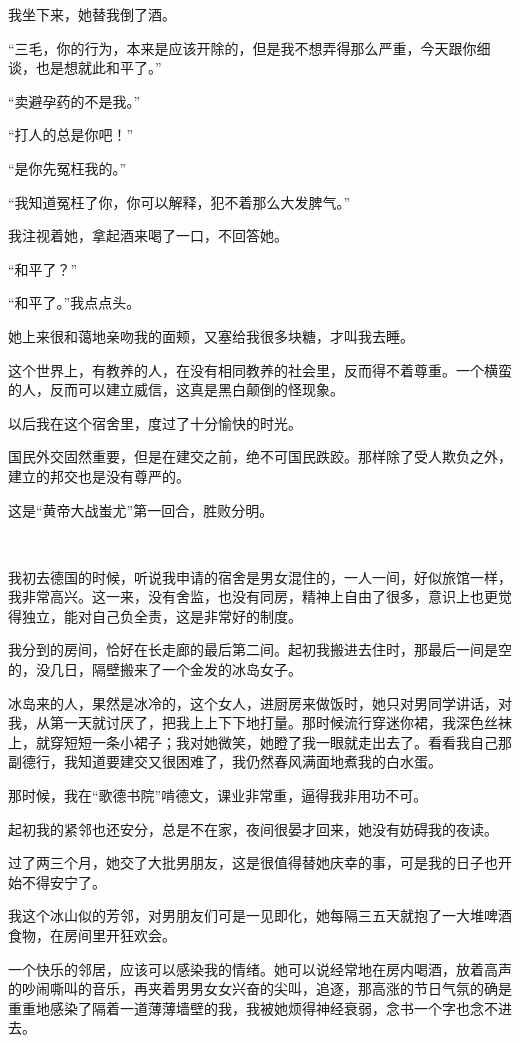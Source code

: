 \par 我坐下来，她替我倒了酒。
\par “三毛，你的行为，本来是应该开除的，但是我不想弄得那么严重，今天跟你细谈，也是想就此和平了。”
\par “卖避孕药的不是我。”
\par “打人的总是你吧！”
\par “是你先冤枉我的。”
\par “我知道冤枉了你，你可以解释，犯不着那么大发脾气。”
\par 我注视着她，拿起酒来喝了一口，不回答她。
\par “和平了？”
\par “和平了。”我点点头。
\par 她上来很和蔼地亲吻我的面颊，又塞给我很多块糖，才叫我去睡。
\par 这个世界上，有教养的人，在没有相同教养的社会里，反而得不着尊重。一个横蛮的人，反而可以建立威信，这真是黑白颠倒的怪现象。
\par 以后我在这个宿舍里，度过了十分愉快的时光。
\par 国民外交固然重要，但是在建交之前，绝不可国民跌跤。那样除了受人欺负之外，建立的邦交也是没有尊严的。
\par 这是“黄帝大战蚩尤”第一回合，胜败分明。
\par  
\par 我初去德国的时候，听说我申请的宿舍是男女混住的，一人一间，好似旅馆一样，我非常高兴。这一来，没有舍监，也没有同房，精神上自由了很多，意识上也更觉得独立，能对自己负全责，这是非常好的制度。
\par 我分到的房间，恰好在长走廊的最后第二间。起初我搬进去住时，那最后一间是空的，没几日，隔壁搬来了一个金发的冰岛女子。
\par 冰岛来的人，果然是冰冷的，这个女人，进厨房来做饭时，她只对男同学讲话，对我，从第一天就讨厌了，把我上上下下地打量。那时候流行穿迷你裙，我深色丝袜上，就穿短短一条小裙子；我对她微笑，她瞪了我一眼就走出去了。看看我自己那副德行，我知道要建交又很困难了，我仍然春风满面地煮我的白水蛋。
\par 那时候，我在“歌德书院”啃德文，课业非常重，逼得我非用功不可。
\par 起初我的紧邻也还安分，总是不在家，夜间很晏才回来，她没有妨碍我的夜读。
\par 过了两三个月，她交了大批男朋友，这是很值得替她庆幸的事，可是我的日子也开始不得安宁了。
\par 我这个冰山似的芳邻，对男朋友们可是一见即化，她每隔三五天就抱了一大堆啤酒食物，在房间里开狂欢会。
\par 一个快乐的邻居，应该可以感染我的情绪。她可以说经常地在房内喝酒，放着高声的吵闹嘶叫的音乐，再夹着男男女女兴奋的尖叫，追逐，那高涨的节日气氛的确是重重地感染了隔着一道薄薄墙壁的我，我被她烦得神经衰弱，念书一个字也念不进去。
